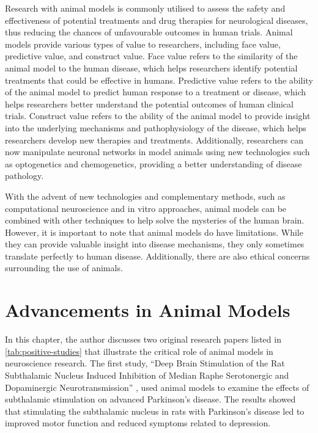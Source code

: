 \documentclass[10pt]{article}
\begin{document}
\begin{sloppypar}
  Research with animal models is commonly utilised to assess the safety and effectiveness of potential treatments and drug therapies for neurological diseases, thus reducing the chances of unfavourable outcomes in human trials. Animal models provide various types of value to researchers, including face value, predictive value, and construct value. Face value refers to the similarity of the animal model to the human disease, which helps researchers identify potential treatments that could be effective in humans. Predictive value refers to the ability of the animal model to predict human response to a treatment or disease, which helps researchers better understand the potential outcomes of human clinical trials. Construct value refers to the ability of the animal model to provide insight into the underlying mechanisms and pathophysiology of the disease, which helps researchers develop new therapies and treatments. Additionally, researchers can now manipulate neuronal networks in model animals using new technologies such as optogenetics and chemogenetics, providing a better understanding of disease pathology.

  With the advent of new technologies and complementary methods, such as computational neuroscience and in vitro approaches, animal models can be combined with other techniques to help solve the mysteries of the human brain. However, it is important to note that animal models do have limitations. While they can provide valuable insight into disease mechanisms, they only sometimes translate perfectly to human disease. Additionally, there are also ethical concerns surrounding the use of animals.

  \section{Advancements in Animal Models}
  \label{sec:advancements}

  In this chapter, the author discusses two original research papers listed in \autoref{tab:positive-studies} that illustrate the critical role of animal models in neuroscience research. The first study, “Deep Brain Stimulation of the Rat Subthalamic Nucleus Induced Inhibition of Median Raphe Serotonergic and Dopaminergic Neurotransmission” \citep{kocabicak_deep_2014}, used animal models to examine the effects of subthalamic stimulation on advanced Parkinson’s disease. The results showed that stimulating the subthalamic nucleus in rats with Parkinson’s disease led to improved motor function and reduced symptoms related to depression.


\end{sloppypar}
\end{document}
